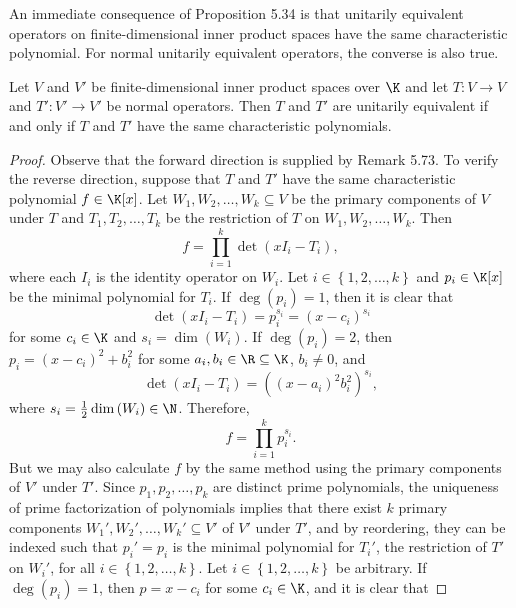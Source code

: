 \documentclass[linearalgebraII]{subfiles}
\begin{document}
    \begin{remark}
        An immediate consequence of Proposition 5.34 is that unitarily equivalent operators on finite-dimensional inner product spaces have the same characteristic polynomial. For normal unitarily equivalent operators, the converse is also true.
    \end{remark}

    \begin{theorem}{}
        Let $V$ and $V'$ be finite-dimensional inner product spaces over $\K$ and let $T:V\to V$ and $T':V'\to V'$ be normal operators. Then $T$ and $T'$ are unitarily equivalent if and only if $T$ and $T'$ have the same characteristic polynomials.
    \end{theorem}

    \begin{proof}
        Observe that the forward direction is supplied by Remark 5.73. To verify the reverse direction, suppose that $T$ and $T'$ have the same characteristic polynomial $f\in\K[x]$. Let $W_1,W_2,\ldots,W_k\subseteq V$ be the primary components of $V$ under $T$ and $T_1,T_2,\ldots,T_k$ be the restriction of $T$ on $W_1,W_2,\ldots,W_k$. Then
        \begin{equation*}
            f = \prod^{k}_{i=1} \det\left( xI_i-T_i \right) ,
        \end{equation*}
        where each $I_i$ is the identity operator on $W_i$. Let $i\in\left\lbrace 1,2,\ldots,k \right\rbrace$ and $p_i\in\K[x]$ be the minimal polynomial for $T_i$. If $\deg\left( p_i \right) =1$, then it is clear that
        \begin{equation*}
            \det\left( xI_i-T_i \right) = p_i^{s_i} = \left( x-c_i \right) ^{s_i}
        \end{equation*}
        for some $c_i\in\K$ and $s_i=\dim\left( W_i \right)$. If $\deg\left( p_i \right) = 2$, then $p_i = \left( x-c_i \right) ^{2} + b_i^{2}$ for some $a_i,b_i\in\R\subseteq\K$, $b_i\neq 0$, and
        \begin{equation*}
            \det\left( xI_i-T_i \right) = \left( \left( x-a_i \right) ^2 b_i^2\right) ^{s_i},
        \end{equation*}
        where $s_i=\frac{1}{2}\dim\left( W_i \right) \in\N$. Therefore,
        \begin{equation*}
            f = \prod^{k}_{i=1} p_i^{s_i}.
        \end{equation*}
        But we may also calculate $f$ by the same method using the primary components of $V'$ under $T'$. Since $p_1,p_2,\ldots,p_k$ are distinct prime polynomials, the uniqueness of prime factorization of polynomials implies that there exist $k$ primary components $W_1', W_2', \ldots, W_k'\subseteq V'$ of $V'$ under $T'$, and by reordering, they can be indexed such that $p_i'=p_i$ is the minimal polynomial for $T_i'$, the restriction of $T'$ on $W_i'$, for all $i\in\left\lbrace 1,2,\ldots,k \right\rbrace$. Let $i\in\left\lbrace 1,2,\ldots,k \right\rbrace$ be arbitrary. If $\deg\left( p_i \right) = 1$, then $p=x-c_i$ for some $c_i\in\K$, and it is clear that

\end{proof}
\end{document}
